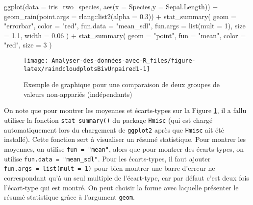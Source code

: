 \documentclass[
]{book}
\newenvironment{Shaded}{\begin{snugshade}}{\end{snugshade}}
\newcommand{\AttributeTok}[1]{\textcolor[rgb]{0.77,0.63,0.00}{#1}}
\newcommand{\DecValTok}[1]{\textcolor[rgb]{0.00,0.00,0.81}{#1}}
\newcommand{\FloatTok}[1]{\textcolor[rgb]{0.00,0.00,0.81}{#1}}
\newcommand{\FunctionTok}[1]{\textcolor[rgb]{0.00,0.00,0.00}{#1}}
\newcommand{\NormalTok}[1]{#1}
\newcommand{\SpecialCharTok}[1]{\textcolor[rgb]{0.00,0.00,0.00}{#1}}
\newcommand{\StringTok}[1]{\textcolor[rgb]{0.31,0.60,0.02}{#1}}
\begin{document}
\begin{Shaded}
\begin{Highlighting}[]
\FunctionTok{ggplot}\NormalTok{(}\AttributeTok{data =}\NormalTok{ iris\_two\_species, }\FunctionTok{aes}\NormalTok{(}\AttributeTok{x =}\NormalTok{ Species,}\AttributeTok{y =}\NormalTok{ Sepal.Length)) }\SpecialCharTok{+}
  \FunctionTok{geom\_rain}\NormalTok{(}\AttributeTok{point.args =}\NormalTok{ rlang}\SpecialCharTok{::}\FunctionTok{list2}\NormalTok{(}\AttributeTok{alpha =} \FloatTok{0.3}\NormalTok{)) }\SpecialCharTok{+}
  \FunctionTok{stat\_summary}\NormalTok{(}
    \AttributeTok{geom =} \StringTok{"errorbar"}\NormalTok{,}
    \AttributeTok{color =} \StringTok{"red"}\NormalTok{,}
    \AttributeTok{fun.data =} \StringTok{"mean\_sdl"}\NormalTok{,}
    \AttributeTok{fun.args =} \FunctionTok{list}\NormalTok{(}\AttributeTok{mult =} \DecValTok{1}\NormalTok{),}
    \AttributeTok{size =} \FloatTok{1.1}\NormalTok{, }
    \AttributeTok{width =} \FloatTok{0.06}
\NormalTok{    ) }\SpecialCharTok{+} 
  \FunctionTok{stat\_summary}\NormalTok{(}
    \AttributeTok{geom =} \StringTok{"point"}\NormalTok{,}
    \AttributeTok{fun =} \StringTok{"mean"}\NormalTok{, }
    \AttributeTok{color =} \StringTok{"red"}\NormalTok{,}
    \AttributeTok{size =} \DecValTok{3}
\NormalTok{    )}
\end{Highlighting}
\end{Shaded}

\begin{figure}

{\centering \texttt{[image: Analyser-des-données-avec-R\_files/figure-latex/raindcloudplotsBivUnpaired1-1]} 

}

\caption{Exemple de graphique pour une comparaison de deux groupes de valeurs non-appariés (indépendants)}\label{fig:raindcloudplotsBivUnpaired1}
\end{figure}

On note que pour montrer les moyennes et écarts-types sur la Figure \ref{fig:raindcloudplotsBivUnpaired1}, il a fallu utiliser la fonction \texttt{stat\_summary()} du package \texttt{Hmisc} (qui est chargé automatiquement lors du chargement de \texttt{ggplot2} après que \texttt{Hmisc} ait été installé). Cette fonction sert à visualiser un résumé statistique. Pour montrer les moyennes, on utilise \texttt{fun\ =\ "mean"}, alors que pour montrer des écarts-types, on utilise \texttt{fun.data\ =\ "mean\_sdl"}. Pour les écarts-types, il faut ajouter \texttt{fun.args\ =\ list(mult\ =\ 1)} pour bien montrer une barre d'erreur ne correspondant qu'à un seul multiple de l'écart-type, car par défaut c'est deux fois l'écart-type qui est montré. On peut choisir la forme avec laquelle présenter le résumé statistique grâce à l'argument \texttt{geom}.
\end{document}
